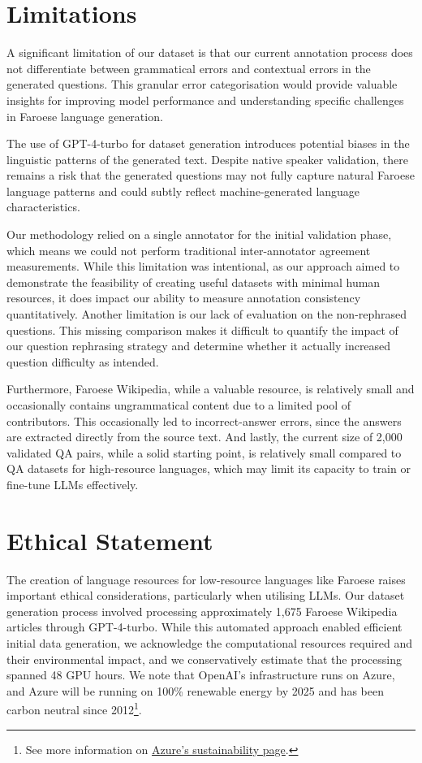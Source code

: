 \documentclass[11pt]{article}
\begin{document}
\section*{Limitations}

A significant limitation of our dataset is that our current annotation process does not
differentiate between grammatical errors and contextual errors in the generated
questions. This granular error categorisation would provide valuable insights for
improving model performance and understanding specific challenges in Faroese language
generation.

The use of GPT-4-turbo for dataset generation introduces potential biases in the
linguistic patterns of the generated text. Despite native speaker validation, there
remains a risk that the generated questions may not fully capture natural Faroese
language patterns and could subtly reflect machine-generated language characteristics.

Our methodology relied on a single annotator for the initial validation phase, which
means we could not perform traditional inter-annotator agreement measurements. While
this limitation was intentional, as our approach aimed to demonstrate the feasibility of
creating useful datasets with minimal human resources, it does impact our ability to
measure annotation consistency quantitatively. Another limitation is our lack of
evaluation on the non-rephrased questions. This missing comparison makes it difficult to
quantify the impact of our question rephrasing strategy and determine whether it
actually increased question difficulty as intended.

Furthermore, Faroese Wikipedia, while a valuable resource, is relatively small and
occasionally contains ungrammatical content due to a limited pool of contributors. This
occasionally led to incorrect-answer errors, since the answers are extracted directly
from the source text. And lastly, the current size of 2,000 validated QA pairs, while a
solid starting point, is relatively small compared to QA datasets for high-resource
languages, which may limit its capacity to train or fine-tune LLMs effectively.

\section*{Ethical Statement}

The creation of language resources for low-resource languages like Faroese raises
important ethical considerations, particularly when utilising LLMs. Our dataset
generation process involved processing approximately 1,675 Faroese Wikipedia articles
through GPT-4-turbo. While this automated approach enabled efficient initial data
generation, we acknowledge the computational resources required and their environmental
impact, and we conservatively estimate that the processing spanned 48 GPU hours. We note
that OpenAI’s infrastructure runs on Azure, and Azure will be running on 100\% renewable
energy by 2025 and has been carbon neutral since 2012\footnote{See more information on
\href{https://azure.microsoft.com/en-gb/explore/global-infrastructure/sustainability}{Azure's
sustainability page}.}.
\end{document}
